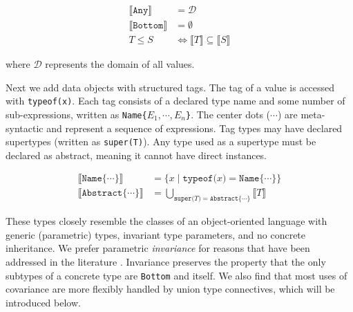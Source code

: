 \vspace{-2ex}
\begin{align*}
  \llbracket \texttt{Any} \rrbracket &= \mathcal{D} \\
  \llbracket \texttt{Bottom} \rrbracket &= \emptyset \\
  T \leq S &\Leftrightarrow \llbracket T \rrbracket \subseteq \llbracket S \rrbracket
\end{align*}

\noindent
where $\mathcal{D}$ represents the domain of all values.

Next we add data objects with structured tags.
The tag of a value is accessed with \texttt{typeof(x)}.
Each tag consists of a declared type name and some number of sub-expressions,
written as \texttt{Name\{}$E_1, \cdots, E_n$\texttt{\}}.
The center dots ($\cdots$) are meta-syntactic and represent a sequence of expressions.
Tag types may have declared supertypes (written as \texttt{super(T)}).
Any type used as a supertype must be declared as abstract, meaning it
cannot have direct instances.

\vspace{-2ex}
\begin{align*}
  \llbracket \texttt{Name\{}\cdots\texttt{\}} \rrbracket &= \{ x\mid \texttt{typeof(}x\texttt{)} = \texttt{Name\{}\cdots\texttt{\}} \} \\
  \llbracket \texttt{Abstract\{}\cdots\texttt{\}} \rrbracket &= \bigcup_{\texttt{super(}T\texttt{)} = \texttt{Abstract\{}\cdots\texttt{\}}} \llbracket T \rrbracket
\end{align*}

These types closely resemble the classes of an object-oriented language with
generic (parametric) types, invariant type parameters, and no concrete inheritance.
We prefer parametric \emph{invariance} for reasons that have been addressed in the
literature \cite{Day:1995:SVC:217838.217852}.
Invariance preserves the property that the only subtypes of a concrete type are \texttt{Bottom}
and itself. We also find that most uses of covariance are more flexibly
handled by union type connectives, which will be introduced below.


